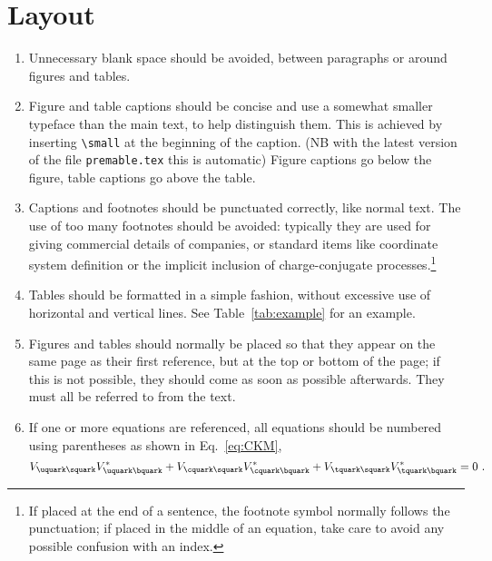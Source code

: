 \section{Layout}

\begin{enumerate}

\item Unnecessary blank space should be avoided, between paragraphs or
  around figures and tables.

\item Figure and table captions should be concise and use a somewhat smaller typeface
  than the main text, to help distinguish them. This is achieved by 
  inserting \verb!\small! at the beginning of the caption.
  (NB with the latest version of the file \verb!premable.tex! this is automatic)
  Figure captions go below the figure, table captions go above the
  table.

\item Captions and footnotes should be punctuated correctly, like
  normal text. The use of too many footnotes should be avoided:
  typically they are used for giving commercial details of companies,
  or standard items like coordinate system definition or the implicit
  inclusion of charge-conjugate processes.\footnote{If placed at the end
    of a sentence, the footnote symbol normally follows the
    punctuation; if placed in the middle of an equation, take care to
    avoid any possible confusion with an index.}

\item Tables should be formatted in a simple fashion, without
  excessive use of horizontal and vertical lines. See
  Table~\ref{tab:example} for an example.

\item Figures and tables should normally be placed so that they appear
  on the same page as their first reference, but at the top or bottom
  of the page; if this is not possible, they should come as soon as
  possible afterwards.  They must all be referred to from the text.

\item If one or more equations are referenced, all equations should be numbered using parentheses as shown in
  Eq.~\ref{eq:CKM},
  \begin{equation}
    \label{eq:CKM}
    V_{\uquark\squark}V_{\uquark\bquark}^* + 
    V_{\cquark\squark}V_{\cquark\bquark}^* + 
    V_{\tquark\squark}V_{\tquark\bquark}^* = 0 \ . 
  \end{equation}
  

\end{enumerate}
